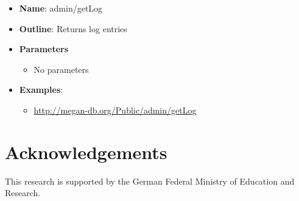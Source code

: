 \documentclass[11pt]{article}
\begin{document}
\begin{itemize}
	\item \textbf{Name}: admin/getLog
	\item \textbf{Outline}: Returns log entries
	\item \textbf{Parameters}
		\begin{itemize}
			\item No parameters
		\end{itemize}
	\item \textbf{Examples}:
		\begin{itemize}
			\item \url{http://megan-db.org/Public/admin/getLog}
		\end{itemize}
\end{itemize}

\section{Acknowledgements}

This research is supported by the German Federal Ministry of Education and Research.



\end{document}
